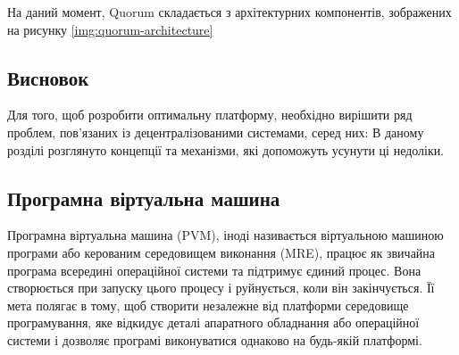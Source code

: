 \documentclass{lib/styles/default-style}
\begin{document}

    На даний момент, Quorum складається з архітектурних компонентів, зображених на рисунку \ref{img:quorum-architecture}



\subsection{Висновок}




    Для того, щоб розробити оптимальну платформу, необхідно вирішити ряд проблем,
    пов'язаних із децентралізованими системами, серед них:
    В даному розділі розглянуто концепції та механізми, які допоможуть усунути ці недоліки.

\subsection{Програмна віртуальна машина}

    Програмна віртуальна машина (PVM), іноді називається віртуальною машиною програми
    або керованим середовищем виконання (MRE), 
    працює як звичайна програма всередині операційної системи та підтримує єдиний процес.
    Вона створюється при запуску цього процесу і руйнується, коли він закінчується.
    Її мета полягає в тому, щоб створити незалежне від платформи середовище програмування,
    яке відкидує деталі апаратного обладнання або операційної системи і
    дозволяє програмі виконуватися однаково на будь-якій платформі.
\end{document}
